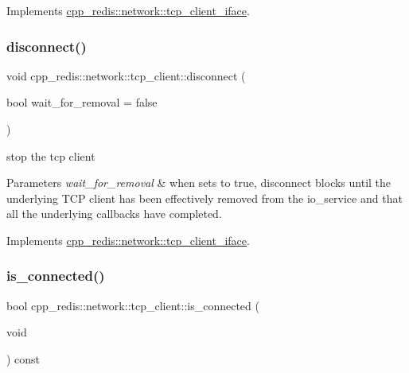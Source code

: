 Implements \hyperlink{classcpp__redis_1_1network_1_1tcp__client__iface_a81ee982136e85b7c3401393341bc594c}{cpp\+\_\+redis\+::network\+::tcp\+\_\+client\+\_\+iface}.

\mbox{\label{classcpp__redis_1_1network_1_1tcp__client_a88f49c4e32d59855a62296fb74136a44}} 
\subsubsection{\texorpdfstring{disconnect()}{disconnect()}}
{\footnotesize\ttfamily void cpp\+\_\+redis\+::network\+::tcp\+\_\+client\+::disconnect (\begin{DoxyParamCaption}\item[{bool}]{wait\+\_\+for\+\_\+removal = {\ttfamily false} }\end{DoxyParamCaption})\hspace{0.3cm}{\ttfamily [virtual]}}

stop the tcp client


\begin{DoxyParams}{Parameters}
{\em wait\+\_\+for\+\_\+removal} & when sets to true, disconnect blocks until the underlying T\+CP client has been effectively removed from the io\+\_\+service and that all the underlying callbacks have completed. \\
\hline
\end{DoxyParams}


Implements \hyperlink{classcpp__redis_1_1network_1_1tcp__client__iface_a024073fb3436d8fa99de8cad63418f6c}{cpp\+\_\+redis\+::network\+::tcp\+\_\+client\+\_\+iface}.

\mbox{\label{classcpp__redis_1_1network_1_1tcp__client_a0a636ca6bd59425bf22416a1c7694f65}} 
\subsubsection{\texorpdfstring{is\+\_\+connected()}{is\_connected()}}
{\footnotesize\ttfamily bool cpp\+\_\+redis\+::network\+::tcp\+\_\+client\+::is\+\_\+connected (\begin{DoxyParamCaption}\item[{void}]{ }\end{DoxyParamCaption}) const\hspace{0.3cm}{\ttfamily [virtual]}}

